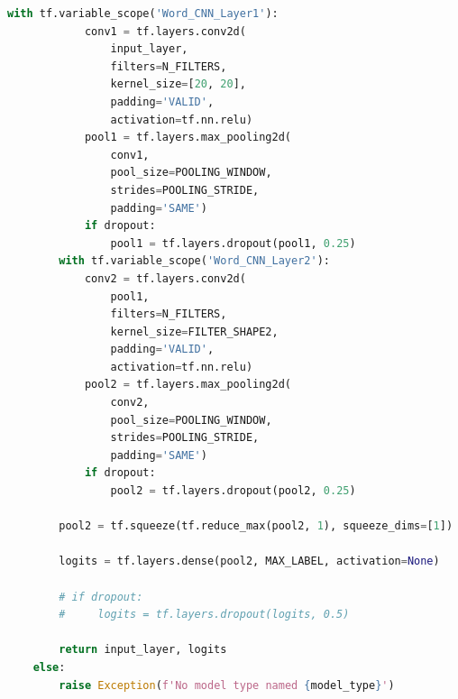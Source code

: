 \begin{lstlisting}[language=Python, caption= Character and word convolutional neural network (layers controlled by layers parameter), label=ls:2_cnn]
        with tf.variable_scope('Word_CNN_Layer1'):
            conv1 = tf.layers.conv2d(
                input_layer,
                filters=N_FILTERS,
                kernel_size=[20, 20],
                padding='VALID',
                activation=tf.nn.relu)
            pool1 = tf.layers.max_pooling2d(
                conv1,
                pool_size=POOLING_WINDOW,
                strides=POOLING_STRIDE,
                padding='SAME')
            if dropout:
                pool1 = tf.layers.dropout(pool1, 0.25)
        with tf.variable_scope('Word_CNN_Layer2'):
            conv2 = tf.layers.conv2d(
                pool1,
                filters=N_FILTERS,
                kernel_size=FILTER_SHAPE2,
                padding='VALID',
                activation=tf.nn.relu)
            pool2 = tf.layers.max_pooling2d(
                conv2,
                pool_size=POOLING_WINDOW,
                strides=POOLING_STRIDE,
                padding='SAME')
            if dropout:
                pool2 = tf.layers.dropout(pool2, 0.25)

        pool2 = tf.squeeze(tf.reduce_max(pool2, 1), squeeze_dims=[1])

        logits = tf.layers.dense(pool2, MAX_LABEL, activation=None)

        # if dropout:
        #     logits = tf.layers.dropout(logits, 0.5)

        return input_layer, logits
    else:
        raise Exception(f'No model type named {model_type}')
\end{lstlisting}

